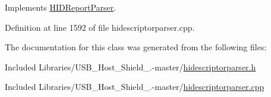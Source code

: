 \-Implements \hyperlink{class_h_i_d_report_parser_ad2837f3d78c7ac3f1c2b3a4815420d97}{\-H\-I\-D\-Report\-Parser}.



\-Definition at line 1592 of file hidescriptorparser.\-cpp.



\-The documentation for this class was generated from the following files\-:\begin{DoxyCompactItemize}
\item 
\-Included Libraries/\-U\-S\-B\-\_\-\-Host\-\_\-\-Shield\-\_.-\/master/\hyperlink{hidescriptorparser_8h}{hidescriptorparser.\-h}\item 
\-Included Libraries/\-U\-S\-B\-\_\-\-Host\-\_\-\-Shield\-\_.-\/master/\hyperlink{hidescriptorparser_8cpp}{hidescriptorparser.\-cpp}\end{DoxyCompactItemize}
